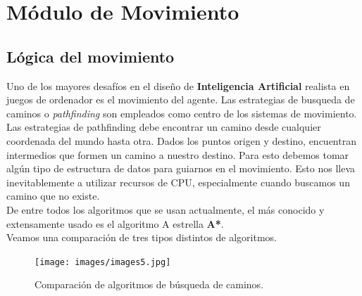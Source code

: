 \documentclass[a4paper,12pt,oneside]{book}
\begin{document}
\section {Módulo de Movimiento}

\subsection{Lógica del movimiento}
Uno de los mayores desafíos en el diseño de {\bf Inteligencia
  Artificial} realista en juegos de ordenador es el movimiento del
agente. Las estrategias de busqueda de caminos o {\it pathfinding} son
empleados como centro de los sistemas de movimiento.\\

Las estrategias de pathfinding debe encontrar un camino desde
cualquier coordenada del mundo hasta otra. Dados los puntos origen y
destino, encuentran intermedios que formen un camino a nuestro
destino. Para esto debemos tomar algún tipo de estructura de datos
para guiarnos en el movimiento. Esto nos lleva inevitablemente a
utilizar recursos de CPU, especialmente cuando buscamos un camino que
no existe.\\

De entre todos los algoritmos que se usan actualmente, el más conocido
y extensamente usado es el algoritmo A estrella {\bf A*}. \\

Veamos una comparación de tres tipos distintos de algoritmos.
\begin{figure}[!h]
  \centering
  \texttt{[image: images/images5.jpg]}\label{comp}
  \caption{Comparación de algoritmos de búsqueda de caminos.}
\end{figure}
\end{document}
